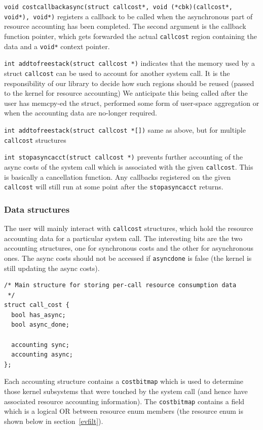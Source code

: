 \documentclass[12pt]{article}
\def\_{\textunderscore\-}
\begin{document}
{\color{blue}\texttt{void cost\_callback\_async(struct call\_cost*, void (*cbk)(call\_cost*, void*), void*)}} registers a callback to be called when the asynchronous part of resource accounting has been completed. The second argument is the callback function pointer, which gets forwarded the actual \texttt{call\_cost} region containing the data and a \texttt{void*} context pointer.

{\color{blue}\texttt{int add\_to\_free\_stack(struct call\_cost *)}} indicates that the memory used by a struct \texttt{call\_cost} can be used to account for another system call. It is the responsibility of our library to decide how such regions should be reused (passed to the kernel for resource accounting) We anticipate this being called after the user has memcpy-ed the struct, performed some form of user-space aggregation or when the accounting data are no-longer required.

{\color{blue}\texttt{int add\_to\_free\_stack(struct call\_cost *[])}} same as above, but for multiple \texttt{call\_cost} structures

{\color{blue}\texttt{int stop\_async\_acct(struct call\_cost *)}} prevents further accounting of the async costs of the system call which is associated with the given \texttt{call\_cost}. This is basically a cancellation function. Any callbacks registered on the given \texttt{call\_cost} will still run at some point after the \texttt{stop\_async\_acct} returns.

\subsubsection{Data structures}

The user will mainly interact with \texttt{call\_cost} structures, which hold the resource accounting data for a particular system call. The interesting bits are the two accounting structures, one for synchronous costs and the other for asynchronous ones. The async costs should not be accessed if \texttt{async\_done} is false (the kernel is still updating the async costs).

\vspace{1em}
\begin{lstlisting}
/* Main structure for storing per-call resource consumption data
 */
struct call_cost {
  bool has_async;
  bool async_done;

  accounting sync;
  accounting async;
};
\end{lstlisting}

Each accounting structure contains a \texttt{cost\_bitmap} which is used to determine those kernel subsystems that were touched by the system call (and hence have associated resource accounting information). The \texttt{cost\_bitmap} contains a field which is a logical OR between resource enum members (the resource enum is shown below in section~\ref{evfilt}).
\end{document}
